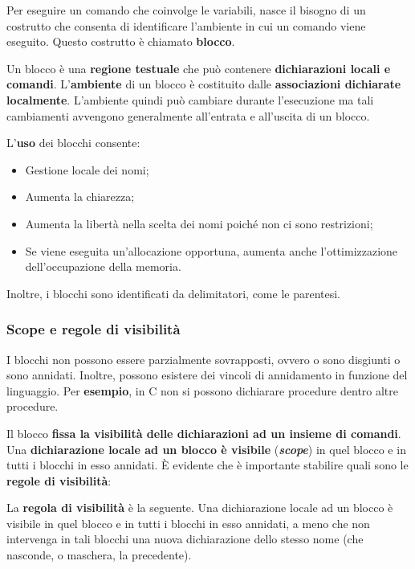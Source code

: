 \documentclass[a4paper]{article}
\begin{document}
 	Per eseguire un comando che coinvolge le variabili, nasce il bisogno di un costrutto che consenta di identificare l'ambiente in cui un comando viene eseguito. Questo costrutto è chiamato \textcolor{Red3}{\textbf{blocco}}.\newline
 	
 	\noindent
 	Un blocco è una \textbf{regione testuale} che può contenere \textbf{dichiarazioni locali e comandi}. L'\textbf{ambiente} di un blocco è costituito dalle \textbf{associazioni dichiarate localmente}. L'ambiente quindi può cambiare durante l'esecuzione ma tali cambiamenti avvengono generalmente all'entrata e all'uscita di un blocco.\newline
 	
 	\noindent
 	L'\textbf{uso} dei blocchi consente:
 	\begin{itemize}
 		\item Gestione locale dei nomi;
 		\item Aumenta la chiarezza;
 		\item Aumenta la libertà nella scelta dei nomi poiché non ci sono restrizioni;
 		\item Se viene eseguita un'allocazione opportuna, aumenta anche l'ottimizzazione dell'occupazione della memoria.
 	\end{itemize}
 	Inoltre, i blocchi sono identificati da delimitatori, come le parentesi.\newpage
 	
 	\subsubsection{Scope e regole di visibilità}
 	
 	I blocchi non possono essere parzialmente sovrapposti, ovvero o sono disgiunti o sono annidati. Inoltre, possono esistere dei vincoli di annidamento in funzione del linguaggio. Per \textcolor{Green4}{\textbf{esempio}}, in C non si possono dichiarare procedure dentro altre procedure.\newline
 	
 	\noindent
 	Il blocco \textbf{fissa la visibilità delle dichiarazioni ad un insieme di comandi}. Una \textbf{dichiarazione locale ad un blocco è visibile} (\textcolor{Red3}{\textbf{\emph{scope}}}) in quel blocco e in tutti i blocchi in esso annidati. È evidente che è importante stabilire quali sono le \textbf{regole di visibilità}:
 	\begin{boxdef}\label{regola di visibilità}
 		La \textcolor{Red3}{\textbf{regola di visibilità}} è la seguente. Una dichiarazione locale ad un blocco è visibile in quel blocco e in tutti i blocchi in esso annidati, a meno che non intervenga in tali blocchi una nuova dichiarazione dello stesso nome (che nasconde, o maschera, la precedente).
 	\end{boxdef}
 	
\end{document}
